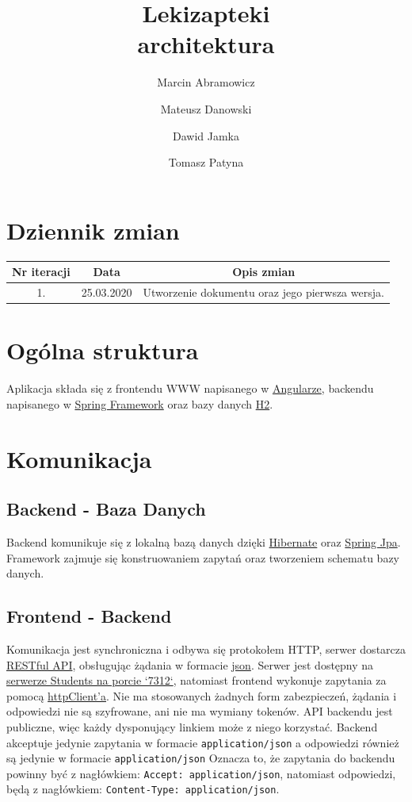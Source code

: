 \documentclass{article}
\title{
Lekizapteki\\
\large architektura}
\author{Marcin Abramowicz \and Mateusz Danowski \and Dawid Jamka \and Tomasz Patyna}
\begin{document}
  \maketitle

  \section{Dziennik zmian}
    \begin{tabular}{|c|c|c|}
      Nr iteracji & Data & Opis zmian \\
      \hline
      1. & 25.03.2020 & Utworzenie dokumentu oraz jego pierwsza wersja. \\
    \end{tabular}

  \section{Ogólna struktura}
    Aplikacja składa się z frontendu WWW napisanego w
    \href{https://angular.io}{Angularze}, backendu napisanego w
    \href{https://spring.io}{Spring Framework} oraz bazy danych
    \href {https://www.h2database.com/html/main.html}{H2}.

  \section{Komunikacja}
    \subsection{Backend - Baza Danych}
    Backend komunikuje się z lokalną bazą danych dzięki
    \href{https://hibernate.org}{Hibernate} oraz
    \href{https://spring.io/projects/spring-data-jpa} {Spring Jpa}.
    Framework zajmuje się konstruowaniem zapytań oraz tworzeniem schematu bazy danych.

    \subsection{Frontend - Backend}
    Komunikacja jest synchroniczna i odbywa się protokołem HTTP, serwer dostarcza
    \href{https://en.wikipedia.org/wiki/Representational_state_transfer}{RESTful API},
    obsługując żądania w formacie
    \href{https://en.wikipedia.org/wiki/JSON}{json}.
    Serwer jest dostępny na
    \href{http://students.mimuw.edu.pl:7312}{serwerze Students na porcie `7312`},
    natomiast frontend wykonuje zapytania za pomocą
    \href{https://angular.io/guide/http}{httpClient'a}.
    Nie ma stosowanych żadnych form zabezpieczeń, żądania i odpowiedzi nie są szyfrowane, ani nie ma wymiany tokenów.
    API backendu jest publiczne, więc każdy dysponujący linkiem może z niego korzystać.
    Backend akceptuje jedynie zapytania w formacie \texttt{application/json}
    a odpowiedzi również są jedynie w formacie \texttt{application/json}
    Oznacza to, że zapytania do backendu powinny być z nagłówkiem: \texttt{Accept: application/json},
    natomiast odpowiedzi, będą z nagłówkiem: \texttt{Content-Type: application/json}.
\end{document}
